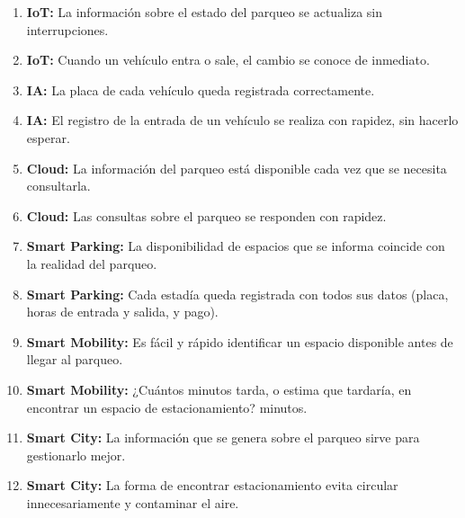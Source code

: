 \documentclass[12pt,a4paper]{article}
\begin{document}
\begin{enumerate}
	\item \textbf{IoT:} La información sobre el estado del parqueo se actualiza sin interrupciones.
	
	\item \textbf{IoT:} Cuando un vehículo entra o sale, el cambio se conoce de inmediato.
	
	\item \textbf{IA:} La placa de cada vehículo queda registrada correctamente.
	
	\item \textbf{IA:} El registro de la entrada de un vehículo se realiza con rapidez, sin hacerlo esperar.
	
	\item \textbf{Cloud:} La información del parqueo está disponible cada vez que se necesita consultarla.
	
	\item \textbf{Cloud:} Las consultas sobre el parqueo se responden con rapidez.
	
	\item \textbf{Smart Parking:} La disponibilidad de espacios que se informa coincide con la realidad del parqueo.
	
	\item \textbf{Smart Parking:} Cada estadía queda registrada con todos sus datos (placa, horas de entrada y salida, y pago).
	
	\item \textbf{Smart Mobility:} Es fácil y rápido identificar un espacio disponible antes de llegar al parqueo.
	
	\item \textbf{Smart Mobility:} ¿Cuántos minutos tarda, o estima que tardaría, en encontrar un espacio de estacionamiento? \underline{\hspace{1.5cm}} minutos.
	
	\item \textbf{Smart City:} La información que se genera sobre el parqueo sirve para gestionarlo mejor.
	
	\item \textbf{Smart City:} La forma de encontrar estacionamiento evita circular innecesariamente y contaminar el aire.
\end{enumerate}


\clearpage
\end{document}
